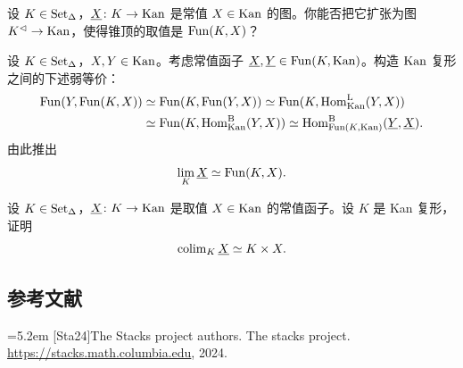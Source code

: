 \begin{exercise}\label{L7-B.1}
设 $K\in\operatorname{Set}_\Delta$，$\underline X\colon K\to\operatorname{Kan}$ 是常值 $X\in\operatorname{Kan}$ 的图。你能否把它扩张为图 $K^{\lhd}\to\operatorname{Kan}$，使得锥顶的取值是 $\operatorname{Fun}(K,X)$？
\end{exercise}

\begin{exercise}\label{L7-B.2}
设 $K\in\operatorname{Set}_\Delta$，$X,Y\in\operatorname{Kan}$。考虑常值函子 $\underline X,\underline Y\in\operatorname{Fun}(K,\operatorname{Kan})$。构造 $\operatorname{Kan}$ 复形之间的下述弱等价：
\begin{align*}
\operatorname{Fun}(Y,\operatorname{Fun}(K,X)) &\simeq \operatorname{Fun}(K,\operatorname{Fun}(Y,X)) \simeq \operatorname{Fun}(K,\operatorname{Hom}^{\mathrm{L}}_{\operatorname{Kan}}(Y,X)) \\
&\simeq \operatorname{Fun}(K,\operatorname{Hom}^{\mathrm{B}}_{\operatorname{Kan}}(Y,X)) \simeq \operatorname{Hom}^{\mathrm{B}}_{\operatorname{Fun}(K,\operatorname{Kan})}(\underline Y,\underline X).
\end{align*}
由此推出
\[
\lim_K \underline X\simeq\operatorname{Fun}(K,X).
\]
\end{exercise}

\begin{exercise}\label{L7-B.3}
设 $K\in\operatorname{Set}_\Delta$，$\underline X\colon K\to\operatorname{Kan}$ 是取值 $X\in\operatorname{Kan}$ 的常值函子。设 $K$ 是 Kan 复形，证明
\[
\operatorname{colim}_K \underline X\simeq K\times X.
\]
\end{exercise}

\subsection*{参考文献}
\par\noindent\hangindent=5.2em [Sta24]\hspace{0.6em}The Stacks project authors. The stacks project. \url{https://stacks.math.columbia.edu}, 2024.

